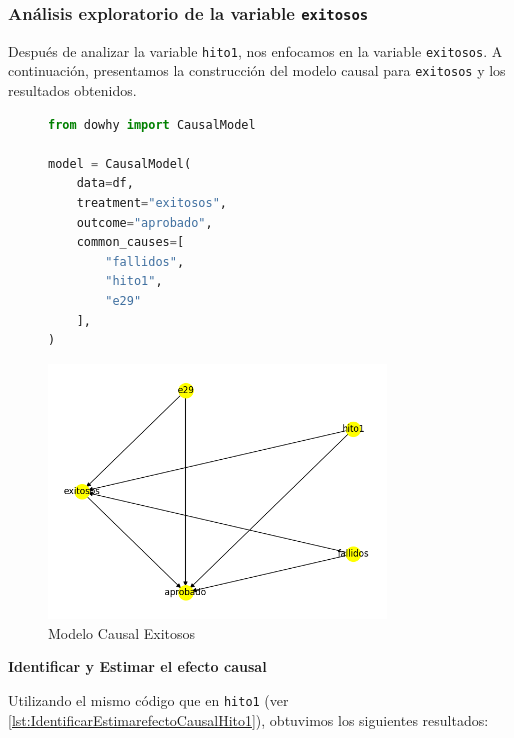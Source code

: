 \subsubsection{Análisis exploratorio de la variable \texttt{exitosos}}
Después de analizar la variable \texttt{hito1}, nos enfocamos en la variable \texttt{exitosos}. A continuación, presentamos la construcción del modelo causal para \texttt{exitosos} y los resultados obtenidos.

\begin{figure}[H]
    \centering
    \begin{minipage}{0.48\textwidth}
        \begin{lstlisting}[language=Python, caption=Modelo causal exitosos, label=lst:model_causalExitosos]
from dowhy import CausalModel

model = CausalModel(
    data=df,
    treatment="exitosos",
    outcome="aprobado",
    common_causes=[
        "fallidos",
        "hito1",
        "e29"
    ],
)
        \end{lstlisting}
    \end{minipage}
    \hfill
    \begin{minipage}{0.48\textwidth}
        \centering
        \includegraphics[width=0.8\textwidth]{img/causalidad/graph_causal_model_exitosos.png}
        \caption{Modelo Causal Exitosos}
        \label{fig:modelo_causal_exitosos}
    \end{minipage}
\end{figure}

\textbf{Identificar y Estimar el efecto causal}

Utilizando el mismo código que en \texttt{hito1} (ver \ref{lst:IdentificarEstimarefectoCausalHito1}), obtuvimos los siguientes resultados:

